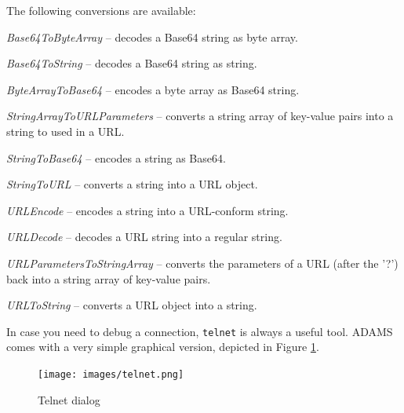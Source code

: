 \documentclass[a4paper]{book}
\begin{document}
The following conversions are available:
\begin{tight_itemize}
    \item \textit{Base64ToByteArray} -- decodes a Base64 string as byte array.
    \item \textit{Base64ToString} -- decodes a Base64 string as string.
    \item \textit{ByteArrayToBase64} -- encodes a byte array as Base64 string.
    \item \textit{StringArrayToURLParameters} -- converts a string array of
    key-value pairs into a string to used in a URL.
    \item \textit{StringToBase64} -- encodes a string as Base64.
    \item \textit{StringToURL} -- converts a string into a URL object.
    \item \textit{URLEncode} -- encodes a string into a URL-conform string.
    \item \textit{URLDecode} -- decodes a URL string into a regular string.
    \item \textit{URLParametersToStringArray} -- converts the parameters of
    a URL (after the '?') back into a string array of key-value pairs.
    \item \textit{URLToString} -- converts a URL object into a string.
\end{tight_itemize}
In case you need to debug a connection, \texttt{telnet} is always a useful tool.
ADAMS comes with a very simple graphical version, depicted in Figure \ref{telnet}.
\begin{figure}[htb]
  \centering
  \texttt{[image: images/telnet.png]}
  \caption{Telnet dialog}
  \label{telnet}
\end{figure}



\end{document}
